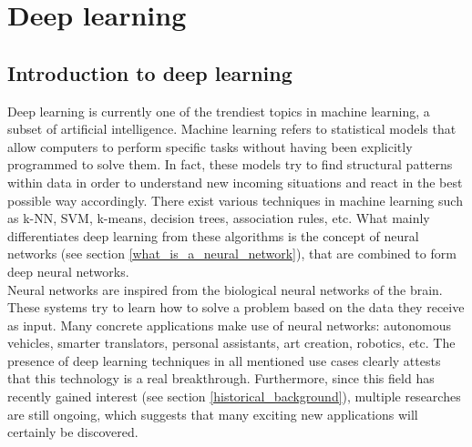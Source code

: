 
\chapter{Deep learning}
\label{ch:deep_learning}

\section{Introduction to deep learning}
Deep learning is currently one of the trendiest topics in machine learning, a subset of artificial intelligence. Machine learning refers to statistical models that allow computers to perform specific tasks without having been explicitly programmed to solve them. In fact, these models try to find structural patterns within data in order to understand new incoming situations and react in the best possible way accordingly. There exist various techniques in machine learning such as k-NN, SVM, k-means, decision trees, association rules, etc. What mainly differentiates deep learning from these algorithms is the concept of neural networks (see section  \ref{what_is_a_neural_network}), that are combined to form deep neural networks.\\
Neural networks are inspired from the biological neural networks of the brain. These systems try to learn how to solve a problem based on the data they receive as input. Many concrete applications make use of neural networks: autonomous vehicles, smarter translators, personal assistants, art creation, robotics, etc. The presence of deep learning techniques in all mentioned use cases clearly attests that this technology is a real breakthrough. Furthermore, since this field has recently gained interest   (see section \ref{historical_background}), multiple researches are still ongoing, which suggests that many exciting new applications will certainly be discovered.

